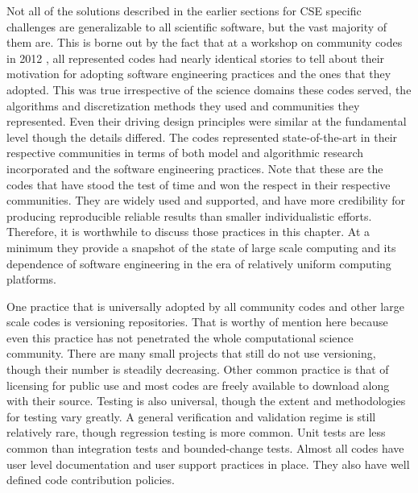 Not all of the solutions described in the earlier sections for CSE
specific challenges are generalizable to all scientific software, but
the vast majority of them are. This is borne out by the fact that at a
workshop on community codes in 2012 \cite{}, all represented codes
had nearly identical stories to tell about their motivation for
adopting software engineering practices and the ones that they
adopted. This was true irrespective of the science domains these codes
served, the algorithms and discretization methods they used and
communities they represented. Even their driving design principles
were similar at the fundamental level though the details differed. The
codes represented state-of-the-art in their respective communities in
terms of both model and algorithmic research incorporated and the
software engineering practices. Note that these are the codes that
have stood the test of time and won the respect in their respective
communities. They are widely used and supported, and have more
credibility for producing reproducible reliable results than smaller
individualistic efforts. Therefore, it is worthwhile to discuss
those practices in this chapter. At a minimum they provide a snapshot
of the state of large scale computing and its dependence of software
engineering in the era of relatively uniform computing platforms. 

One practice that is universally adopted by all community codes and
other large scale codes is versioning repositories. That is worthy of
mention here because even this practice has not penetrated the whole
computational science community. There are many small projects
that still do not use versioning, though their number is steadily
decreasing. Other common practice is that of licensing for public use
and most codes are freely available to download along with their
source. Testing is also universal, though the extent and methodologies
for testing vary greatly. A general verification and validation regime
is still relatively rare, though regression testing is more
common. Unit tests are less common than integration tests and
bounded-change tests. Almost all codes have user level documentation
and user support practices in place. They also have well defined code
contribution policies. 

